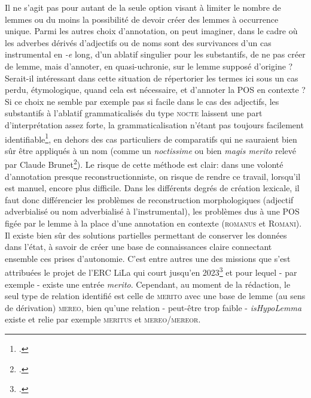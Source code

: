 Il ne s'agit pas pour autant de la seule option visant à limiter le nombre de lemmes ou du moins la possibilité de devoir créer des lemmes à occurrence unique. Parmi les autres choix d'annotation, on peut imaginer, dans le cadre où les adverbes dérivés d'adjectifs ou de noms sont des survivances d'un cas instrumental en \textit{-e} long, d'un ablatif singulier pour les substantifs, de ne pas créer de lemme, mais d'annoter, en quasi-uchronie, sur le lemme supposé d'origine ? Serait-il intéressant dans cette situation de répertorier les termes ici sous un cas perdu, étymologique, quand cela est nécessaire, et d'annoter la POS en contexte ? Si ce choix ne semble par exemple pas si facile dans le cas des adjectifs, les substantifs à l'ablatif grammaticalisés du type \textsc{nocte} laissent une part d'interprétation assez forte, la grammaticalisation n'étant pas toujours facilement identifiable\footcite{fruyt_adverbes_2008}, en dehors des cas particuliers de comparatifs qui ne sauraient bien sûr être appliqués à un nom (comme un \textit{noctissime}%
ou bien \textit{magis merito} relevé par Claude Brunet\footcite{brunet_merito_2008}). Le risque de cette méthode est clair: dans une volonté d'annotation presque reconstructionniste, on risque de rendre ce travail, lorsqu'il est manuel, encore plus difficile. Dans les différents degrés de création lexicale, il faut donc différencier les problèmes de reconstruction morphologiques (adjectif adverbialisé ou nom adverbialisé à l'instrumental), les problèmes dus à une POS figée par le lemme à la place d'une annotation en contexte (\textsc{romanus} et \textsc{Romani}). Il existe bien sûr des solutions partielles permettant de conserver les données dans l'état, à savoir de créer une base de connaissances claire connectant ensemble ces prises d'autonomie. C'est entre autres une des missions que s'est attribuées le projet de l'ERC LiLa qui court jusqu'en 2023\footcite{passarotti_interlinking_2020} et pour lequel - par exemple - existe une entrée \textit{merito}. Cependant, au moment de la rédaction, le seul type de relation identifié est celle de \textsc{merito} avec une base de lemme (au sens de dérivation) \textsc{mereo}, bien qu'une relation - peut-être trop faible - \textit{isHypoLemma} existe et relie par exemple \textsc{meritus} et \textsc{mereo/mereor}.


